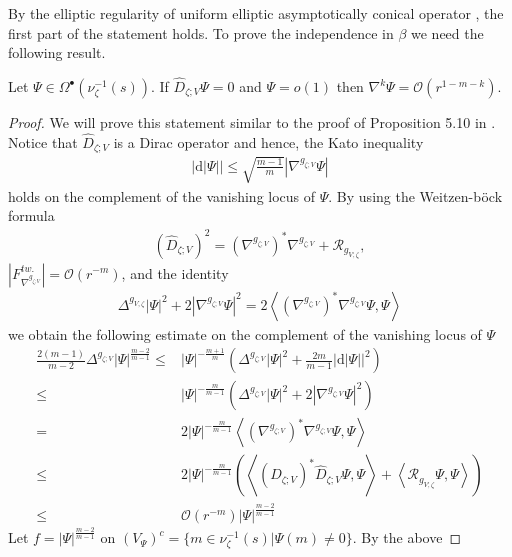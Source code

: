 \documentclass[psamsfonts]{amsart}
\theoremstyle{plain}
\theoremstyle{definition}{
\newtheorem{defi}{Definition}[section]
\newtheorem{ass}{Assumption}
\newtheorem*{nota}{Notation}}
\theoremstyle{remark}{
\newtheorem{rem}{Remark}
\newtheorem{ex}{Example}}
\theoremstyle{plain}{
\newtheorem{thm}{Theorem}[section]
\newtheorem{lem}{Lemma}[section]
\newtheorem{cor}{Corollary}[section]
\newtheorem{prop}{Proposition}[section]
\newtheorem{con}{Conjecture}[section]}
\newcommand{\m}[1]{{\mathrm{#1}}}
\begin{document}
By the elliptic regularity of uniform elliptic asymptotically conical operator \cite{marshal2002deformations}, the first part of the statement holds. To prove the independence in $\beta$ we need the following result.

\begin{prop}
\label{diracspinorsthatdecaydecayfast}
Let $\Psi\in \Omega^{\bullet}(\nu^{-1}_\zeta(s))$. If $\widehat{D}_{\zeta;V}\Psi=0$ and $\Psi=o(1)$ then $\nabla^k\Psi=\mathcal{O}(r^{1-m-k})$.
\end{prop}

\begin{proof}
We will prove this statement similar to the proof of Proposition 5.10 in \cite{walpuski2012G2}. Notice that $\widehat{D}_{\zeta;V}$ is a Dirac operator and hence, the Kato inequality
\begin{align}
\label{Katoinequalty}
    |\m{d}|\Psi||\leq\sqrt{\frac{m-1}{m}}|\nabla^{g_{\zeta;V}}\Psi|
\end{align}
holds on the complement of the vanishing locus of $\Psi$. By using the Weitzen-böck formula 
\begin{align*}
    (\widehat{D}_{\zeta;V})^2=(\nabla^{g_{\zeta;V}})^*\nabla^{g_{\zeta;V}}+\mathcal{R}_{g_{V;\zeta}},
\end{align*}
$|F^{tw.}_{\nabla^{g_{\zeta;V}}}|=\mathcal{O}(r^{-m})$, and the identity
\begin{align*}
    \Delta^{g_{V,\zeta}}|\Psi|^2+2|\nabla^{g_{\zeta;V}}\Psi|^2=2\left<(\nabla^{g_{\zeta;V}})^*\nabla^{g_{\zeta;V}}\Psi,\Psi\right>
\end{align*}
we obtain the following estimate on the complement of the vanishing locus of $\Psi$
\begin{align*}
    \frac{2(m-1)}{m-2} \Delta^{g_{\zeta;V}}|\Psi|^{\frac{m-2}{m-1}}\leq&|\Psi|^{-\frac{m+1}{m}}\left(\Delta^{g_{\zeta;V}}|\Psi|^{2}+\frac{2m}{m-1}|\m{d}|\Psi||^2\right)\\
    \leq&|\Psi|^{-\frac{m}{m-1}}\left(\Delta^{g_{\zeta;V}}|\Psi|^{2}+2|\nabla^{g_{\zeta;V}}\Psi|^2\right)\\
    =&2|\Psi|^{-\frac{m}{m-1}}\left<(\nabla^{g_{\zeta;V}})^*\nabla^{g_{\zeta;V}}\Psi,\Psi\right>\\
    \leq&2|\Psi|^{-\frac{m}{m-1}}\left(\left<(\widehat{D}_{\zeta;V})^*\widehat{D}_{\zeta;V}\Psi,\Psi\right>+\left<\mathcal{R}_{g_{V;\zeta}}\Psi,\Psi\right>\right)\\
    \leq&\mathcal{O}(r^{-m})|\Psi|^{\frac{m-2}{m-1}}
\end{align*}
Let $f=|\Psi|^{\frac{m-2}{m-1}}$ on $(V_\Psi)^c=\{m\in \nu_\zeta^{-1}(s)|\Psi(m)\neq0\}$. By the above

\end{proof}
\end{document}
